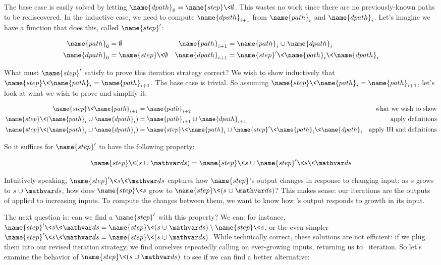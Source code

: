 \noindent
The base case is easily solved by letting $\name{dpath}_0 = \name{step}\<\emptyset$. This wastes no work since there are no previously-known paths to be rediscovered. In the inductive case, we need to compute $\name{dpath}_{i+1}$ from $\name{path}_i$ and $\name{dpath}_i$. Let's imagine we have a function that does this, called $\name{step}'$:

\begin{align*}
  \name{path}_0 &= \emptyset
  &
  \name{path}_{i+1} &= \name{path}_i \cup \name{dpath}_i\\
  \name{dpath}_0 &= \name{step}\<\emptyset
  &
  \name{dpath}_{i+1} &= \name{step}' \<\name{path}_i \<\name{dpath}_i
\end{align*}

\noindent
What must $\name{step}'$ satisfy to prove this iteration strategy correct?
%
We wish to show inductively that $\name{step}\<\name{path}_i = \name{path}_{i+1}$.
%
The base case is trivial. So assuming $\name{step}\<\name{path}_{i} = \name{path}_{i+1}$, let's look at what we wish to prove and simplify it:

\begin{align*}
  \name{step} \<\name{path}_{i+1}
  &=
  \name{path}_{i+2}
  & \text{what we wish to show}
  \\
  \name{step} \<(\name{path}_i \cup \name{dpath}_i)
  &=
  \name{path}_{i+1} \cup \name{dpath}_{i+1}
  & \text{apply definitions}
  \\
  \name{step} \<(\name{path}_i \cup \name{dpath}_i)
  &=
  \name{step} \<\name{path}_i \cup \name{step}' \<\name{path}_i \<\name{dpath}_i
  & \text{apply IH and definitions}
\end{align*}

\noindent
So it suffices for $\name{step}'$ to have the following property:

\nopagebreak[1]
\[
\name{step}\<(s \cup \ds) = \name{step}\<s \cup \name{step}' \<s \<\ds 
\]

\noindent
Intuitively speaking, $\name{step}' \<s \<\ds$ captures how $\name{step}$'s output changes in response to changing input: as $s$ grows to $s \cup \ds$, how does $\name{step}\<s$ grow to $\name{step}\<(s \cup \ds)$?
%
This makes sense: our iterations are the outputs of  applied to increasing inputs. To compute the changes between them, we want to know how 's output responds to growth in its input.

The next question is: can we find a $\name{step}'$ with this property?
%
We can: for instance, \( \name{step}' \<s \<\ds = \name{step}\<(s
\cup \ds) \setminus \name{step}\<s \), or the even simpler $\name{step}' \<s \<\ds = \name{step}\<(s \cup \ds)$.
%
While technically correct, these solutions are not efficient:
if we plug them into our revised iteration strategy, we find ourselves repeatedly calling  on ever-growing inputs, returning us to \naive\ iteration.
%
So let's examine the behavior of $\name{step} \<(s \cup \ds)$ to see if we can find a better alternative:

